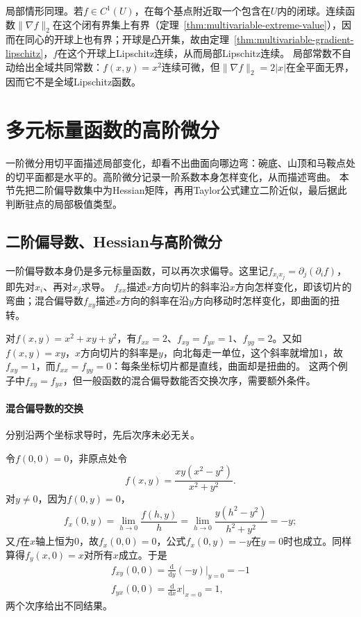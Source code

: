 局部情形同理。若$f\in C^1(U)$，在每个基点附近取一个包含在$U$内的闭球。连续函数$\lVert\nabla f\rVert_2$在这个闭有界集上有界（定理~\ref{thm:multivariable-extreme-value}），因而在同心的开球上也有界；开球是凸开集，故由定理~\ref{thm:multivariable-gradient-lipschitz}，$f$在这个开球上Lipschitz连续，从而局部Lipschitz连续。
局部常数不自动给出全域共同常数：$f(x,y)=x^2$连续可微，但$\lVert\nabla f\rVert_2=2|x|$在全平面无界，因而它不是全域Lipschitz函数。

\section{多元标量函数的高阶微分}
\label{sec:multivariable-curvature-error}

一阶微分用切平面描述局部变化，却看不出曲面向哪边弯：碗底、山顶和马鞍点处的切平面都是水平的。高阶微分记录一阶系数本身怎样变化，从而描述弯曲。
本节先把二阶偏导数集中为Hessian矩阵，再用Taylor公式建立二阶近似，最后据此判断驻点的局部极值类型。

\subsection{二阶偏导数、Hessian与高阶微分}

一阶偏导数本身仍是多元标量函数，可以再次求偏导。这里记$f_{x_i x_j}=\partial_j(\partial_i f)$，即先对$x_i$、再对$x_j$求导。
$f_{xx}$描述$x$方向切片的斜率沿$x$方向怎样变化，即该切片的弯曲；混合偏导数$f_{xy}$描述$x$方向的斜率在沿$y$方向移动时怎样变化，即曲面的扭转。

对$f(x,y)=x^2+xy+y^2$，有$f_{xx}=2$、$f_{xy}=f_{yx}=1$、$f_{yy}=2$。又如$f(x,y)=xy$，$x$方向切片的斜率是$y$，向北每走一单位，这个斜率就增加$1$，故$f_{xy}=1$，而$f_{xx}=f_{yy}=0$：每条坐标切片都是直线，曲面却是扭曲的。
这两个例子中$f_{xy}=f_{yx}$，但一般函数的混合偏导数能否交换次序，需要额外条件。

\paragraph{混合偏导数的交换}
分别沿两个坐标求导时，先后次序未必无关。
\begin{example}[混合偏导数与求导次序有关]
\label{ex:multivariable-mixed-partials-differ}
令$f(0,0)=0$，非原点处令
\[
 f(x,y)=\frac{xy(x^2-y^2)}{x^2+y^2}.
\]
对$y\neq0$，因为$f(0,y)=0$，
\[
 f_x(0,y)=\lim_{h\to0}\frac{f(h,y)}h=\lim_{h\to0}\frac{y(h^2-y^2)}{h^2+y^2}=-y;
\]
又$f$在$x$轴上恒为$0$，故$f_x(0,0)=0$，公式$f_x(0,y)=-y$在$y=0$时也成立。同样算得$f_y(x,0)=x$对所有$x$成立。于是
\[
 \begin{gathered}
f_{xy}(0,0)=\frac{\mathrm d}{\mathrm dy}(-y)\Big|_{y=0}=-1\\
f_{yx}(0,0)=\frac{\mathrm d}{\mathrm dx}x\Big|_{x=0}=1,
 \end{gathered}
\]
两个次序给出不同结果。
\end{example}

